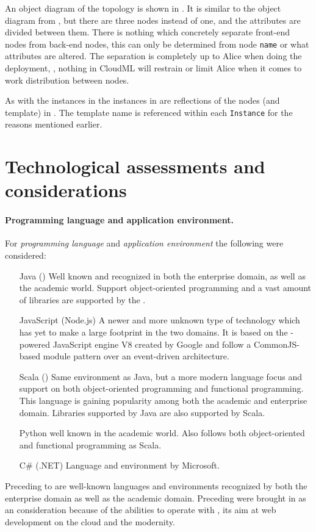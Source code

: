 An object diagram of the topology is shown in .
It is similar to the object diagram from ,
but there are three nodes instead of one, and the attributes are divided between them.
There is nothing which concretely separate front-end nodes from back-end nodes,
this can only be determined from node \texttt{name} or what attributes are altered.
The separation is completely up to Alice when doing the deployment,
\ie, nothing in CloudML will restrain or limit Alice 
when it comes to work distribution between nodes.

As with the instances in  the instances in 
are reflections of the nodes (and template) in .
The template name is referenced within each \texttt{Instance} 
for the reasons mentioned earlier.

\section{Technological assessments and considerations}



\paragraph{Programming language and application environment.}

For \emph{programming language} and \emph{application environment} the following were considered:
\begin{itemize}
  \item[Java (\myac{JVM})] Well known and recognized in both the enterprise domain, as well as the academic world.
    Support object-oriented programming and a vast amount of libraries are supported by the .
  \item[JavaScript (Node.js)] A newer and more unknown type of technology which has yet to 
    make a large footprint in the two domains. 
    It is based on the -powered JavaScript engine V8 created by Google and follow a 
    CommonJS-based module pattern over an event-driven architecture.
  \item[Scala (\myac{JVM})] Same environment as Java, but a more modern language focus and support on both 
    object-oriented programming and functional programming.
    This language is gaining popularity among both the academic and enterprise domain.
    Libraries supported by Java are also supported by Scala.
  \item[Python] well known in the academic world. Also follows both object-oriented and functional programming as
    Scala.
  \item[C\# (.NET)] Language and environment by Microsoft.
\end{itemize}
Preceding  to  are well-known languages and environments recognized by both the enterprise domain as well as the academic domain.
Preceding  were brought in as an consideration because of the abilities to operate
with , its aim at web development on the cloud and the modernity.

